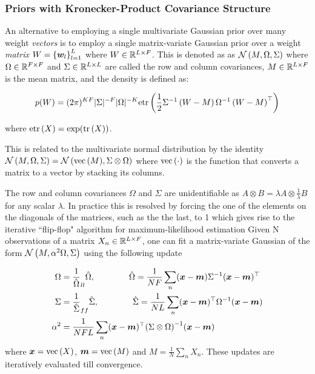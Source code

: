 

\subsubsection{Priors with Kronecker-Product Covariance Structure}
An alternative to employing a single multivariate Gaussian prior over many weight \emph{vectors} is to employ a single matrix-variate Gaussian\cite{Gupta1999} prior over a weight \emph{matrix} $W = \left\{\bm w_l\right\}_{l=1}^L$ where $W \in { \mathbb{R}^{L \times F} }$. This is denoted as as $\mathcal{N} \left(M, \Omega, \Sigma\right)$ where $\Omega \in { \mathbb{R}^{F \times F} }$ and $\Sigma \in { \mathbb{R}^{L \times L} }$ are called the row and column covariances, $M \in { \mathbb{R}^{L \times F} }$ is the mean matrix, and the density is defined as:

\begin{equation}
p(W) = (2\pi)^{KF}|\Sigma|^{-F}|\Omega|^{-K} \text{etr}\left( { \frac{1}{2} {\Sigma}^{-1}\left(W - M\right) {\Omega}^{-1} \left(W - M \right)^\top } \right)
\end{equation}

where $\text{etr}\left( { X } \right) = \exp (\text{tr} \left( {X} \right))$.

This is related to the multivariate normal distribution by the identity $\mathcal{N} \left(M, \Omega, \Sigma\right) = \mathcal{N} \left( {\text{vec}\left(M\right)}, {\Sigma \otimes \Omega} \right)$ where $\text{vec}\left(\cdot\right)$ is the function that converts a matrix to a vector by stacking its columns. 

The row and column covariances $\Omega$ and $\Sigma$ are unidentifiable as $A \otimes B = \lambda A \otimes \frac{1}{\lambda}B$ for any scalar $\lambda$. In practice this is resolved by forcing the one of the elements on the diagonals of the matrices, such as the the last, to 1 which gives rise to the iterative ``flip-flop" algorithm\cite{Srivastava2009} for maximum-likelihood estimation Given N observations of a matrix $X_n \in { \mathbb{R}^{L \times F} }$, one can fit a matrix-variate Gaussian of the form $\mathcal{N} \left(M, \alpha^2 \Omega, \Sigma\right)$ using the following update

\begin{align}
\Omega & = \frac{1}{\hat{\Omega}}_{ll} \hat{\Omega}, \qquad\qquad\hat{\Omega} = \frac{1}{N F} \sum_n (\bm x - \bm m) {\Sigma}^{-1} (\bm x - \bm m)^\top \\
\Sigma & = \frac{1}{\hat{\Sigma}}_{ff} \hat{\Sigma}, \qquad\qquad\hat{\Sigma} = \frac{1}{N L} \sum_n (\bm x - \bm m)^\top {\Omega}^{-1} (\bm x - \bm m) \\
\alpha^2 & = \frac{1}{NFL} \sum_n (\bm x - \bm m)^\top{\left( \Sigma \otimes \Omega \right)}^{-1}(\bm x - \bm m)
\end{align}
where $\bm x = \text{vec}\left(X\right)$, $\bm m = \text{vec}\left(M\right)$ and $M=\frac{1}{N} \sum_n X_n$. These updates are iteratively evaluated till convergence.


